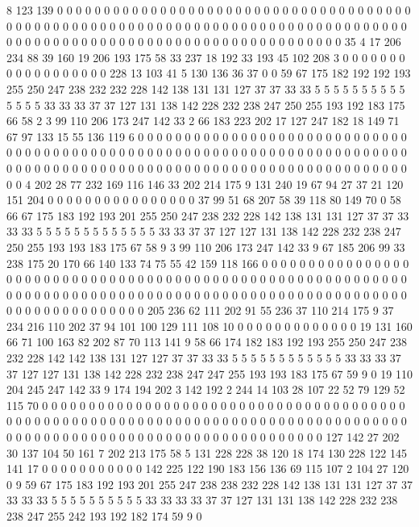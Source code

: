 8 123 139 0 0 0 0 0 0 0 0 0 0 0 0 0 0 0 0 0
0 0 0 0 0 0 0 0 0 0 0 0 0 0 0 0 0 0 0 0
0 0 0 0 0 0 0 0 0 0 0 0 0 0 0 0 0 0 0 0
0 0 0 0 0 0 0 0 0 0 0 0 0 0 0 0 0 0 0 0
0 0 0 0 0 0 0 0 0 0 0 0 0 0 0 0 0 0 0 0
0 0 0 0 0 0 0 0 0 0 0 0 0 0 0 0 0 0 0 0
35 4 17 206 234 88 39 160 19 206 193 175 58 33 237 18 192 33 193 45
102 208 3 0 0 0 0 0 0 0 0 0 0 0 0 0 0 0 0 0
0 228 13 103 41 5 130 136 36 37 0 0 59 67 175 182 192 192 193 255
250 247 238 232 232 228 142 138 131 131 127 37 37 33 33 5 5 5 5 5
5 5 5 5 5 5 5 5 5 33 33 33 37 37 127 131 138 142 228 232
238 247 250 255 193 192 183 175 66 58 2 3 99 110 206 173 247 142 33 2
66 183 223 202 17 127 247 182 18 149 71 67 97 133 15 55 136 119 6 0
0 0 0 0 0 0 0 0 0 0 0 0 0 0 0 0 0 0 0 0
0 0 0 0 0 0 0 0 0 0 0 0 0 0 0 0 0 0 0 0
0 0 0 0 0 0 0 0 0 0 0 0 0 0 0 0 0 0 0 0
0 0 0 0 0 0 0 0 0 0 0 0 0 0 0 0 0 0 0 0
0 0 0 0 0 0 0 0 0 0 0 0 0 0 0 0 0 0 0 0
0 0 0 0 0 0 0 0 0 0 0 0 0 0 0 0 4 202 28 77
232 169 116 146 33 202 214 175 9 131 240 19 67 94 27 37 21 120 151 204
0 0 0 0 0 0 0 0 0 0 0 0 0 0 0 0 37 99 51 68
207 58 39 118 80 149 70 0 58 66 67 175 183 192 193 201 255 250 247 238
232 228 142 138 131 131 127 37 37 33 33 33 5 5 5 5 5 5 5 5
5 5 5 5 5 33 33 37 37 127 127 131 138 142 228 232 238 247 250 255
193 193 183 175 67 58 9 3 99 110 206 173 247 142 33 9 67 185 206 99
33 238 175 20 170 66 140 133 74 75 55 42 159 118 166 0 0 0 0 0
0 0 0 0 0 0 0 0 0 0 0 0 0 0 0 0 0 0 0 0
0 0 0 0 0 0 0 0 0 0 0 0 0 0 0 0 0 0 0 0
0 0 0 0 0 0 0 0 0 0 0 0 0 0 0 0 0 0 0 0
0 0 0 0 0 0 0 0 0 0 0 0 0 0 0 0 0 0 0 0
0 0 0 0 0 0 0 0 0 0 0 0 0 0 0 0 0 0 0 0
0 0 0 0 0 0 0 0 0 0 0 0 205 236 62 111 202 91 55 236
37 110 214 175 9 37 234 216 110 202 37 94 101 100 129 111 108 10 0 0
0 0 0 0 0 0 0 0 0 0 0 19 131 160 66 71 100 163 82 202
87 70 113 141 9 58 66 174 182 183 192 193 255 250 247 238 232 228 142 142
138 131 127 127 37 37 33 33 5 5 5 5 5 5 5 5 5 5 5 5
33 33 33 37 37 127 127 131 138 142 228 232 238 247 247 255 193 193 183 175
67 59 9 0 19 110 204 245 247 142 33 9 174 194 202 3 142 192 2 244
14 103 28 107 22 52 79 129 52 115 70 0 0 0 0 0 0 0 0 0
0 0 0 0 0 0 0 0 0 0 0 0 0 0 0 0 0 0 0 0
0 0 0 0 0 0 0 0 0 0 0 0 0 0 0 0 0 0 0 0
0 0 0 0 0 0 0 0 0 0 0 0 0 0 0 0 0 0 0 0
0 0 0 0 0 0 0 0 0 0 0 0 0 0 0 0 0 0 0 0
0 0 0 0 0 0 0 0 0 0 0 0 0 0 0 0 0 0 0 0
0 0 0 0 0 0 0 127 142 27 202 30 137 104 50 161 7 202 213 175
58 5 131 228 228 38 120 18 174 130 228 122 145 141 17 0 0 0 0 0
0 0 0 0 0 0 142 225 122 190 183 156 136 69 115 107 2 104 27 120
0 9 59 67 175 183 192 193 201 255 247 238 238 232 228 142 138 131 131 127
37 37 33 33 33 5 5 5 5 5 5 5 5 5 5 33 33 33 33 37
37 127 131 131 138 142 228 232 238 238 247 255 242 193 192 182 174 59 9 0
